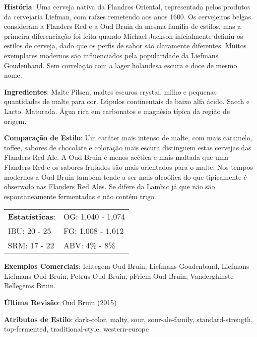 \textbf{História}: Uma cerveja nativa da Flandres Oriental, representada pelos produtos da cervejaria Liefman, com raízes remetendo aos anos 1600. Os cervejeiros belgas consideram a Flanders Red e a Oud Bruin da mesma família de estilos, mas a primeira diferenciação foi feita quando Michael Jackson inicialmente definiu os estilos de cerveja, dado que os perfis de sabor são claramente diferentes. Muitos exemplares modernos são influenciados pela popularidade da Liefmans Goudenband. Sem correlação com a lager holandesa escura e doce de mesmo nome.

\textbf{Ingredientes}: Malte Pilsen, maltes escuros crystal, milho e pequenas quantidades de malte para cor. Lúpulos continentais de baixo alfa ácido. Sacch e Lacto. Maturada. Água rica em carbonatos e magnésio típica da região de origem.

\textbf{Comparação de Estilo}: Um caráter mais intenso de malte, com mais caramelo, toffee, sabores de chocolate e coloração mais escura distinguem estas cervejas das Flanders Red Ale. A Oud Bruin é menos acética e mais maltada que uma Flanders Red e os sabores frutados são mais orientados para o malte. Nos tempos modernos a Oud Bruin também tende a ser mais alcoólica do que tipicamente é observado nas Flanders Red Ales. Se difere da Lambic já que não são espontaneamente fermentadas e não contém trigo.

\begin{tabular}{@{}p{35mm}p{35mm}@{}}
  \textbf{Estatísticas}: & OG: 1,040 - 1,074 \\
  IBU: 20 - 25  & FG: 1,008 - 1,012  \\
  SRM: 17 - 22  & ABV: 4\% - 8\%
\end{tabular}

\textbf{Exemplos Comerciais}: Ichtegem Oud Bruin, Liefmans Goudenband, Liefmans Liefmans Oud Bruin, Petrus Oud Bruin, pFriem Oud Bruin, Vanderghinste Bellegems Bruin.

\textbf{Última Revisão}: Oud Bruin (2015)

\textbf{Atributos de Estilo}: dark-color, malty, sour, sour-ale-family, standard-strength, top-fermented, traditional-style, western-europe
